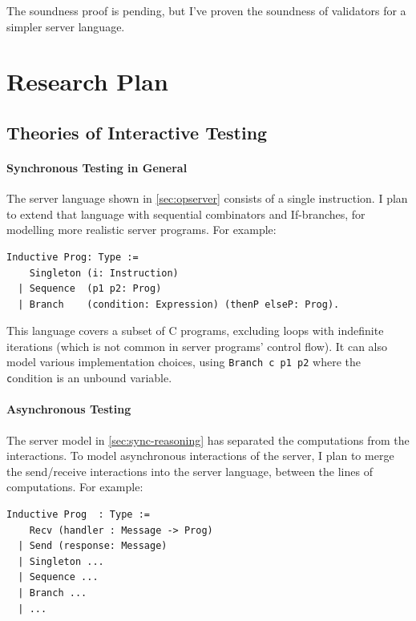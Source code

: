 \documentclass{article}
\newcommand{\ilc}[1]{\lstinline[style=customcoq]{#1}}
\theoremstyle{definition}
\begin{document}
The soundness proof is pending, but I've proven the soundness of validators for
a simpler server language.

\section{Research Plan}
\label{sec:research-plan}

\subsection{Theories of Interactive Testing}
\label{sec:future-theories}

\paragraph{Synchronous Testing in General}
The server language shown in \autoref{sec:opserver} consists of a single
instruction.  I plan to extend that language with sequential combinators and
If-branches, for modelling more realistic server programs.  For example:

\begin{lstlisting}[style=customcoq]
  Inductive Prog: Type :=
    Singleton (i: Instruction)
  | Sequence  (p1 p2: Prog)
  | Branch    (condition: Expression) (thenP elseP: Prog).
\end{lstlisting}

This language covers a subset of C programs, excluding loops with indefinite
iterations (which is not common in server programs' control flow).  It can also
model various implementation choices, using \ilc{Branch c p1 p2} where the
\ilc{c}ondition is an unbound variable.

\paragraph{Asynchronous Testing}
The server model in \autoref{sec:sync-reasoning} has separated the computations
from the interactions.  To model asynchronous interactions of the server, I plan
to merge the send/receive interactions into the server language, between the
lines of computations.  For example:

\begin{lstlisting}[style=customcoq]
  Inductive Prog  : Type :=
    Recv (handler : Message -> Prog)
  | Send (response: Message)
  | Singleton ...
  | Sequence ...
  | Branch ...
  | ...
\end{lstlisting}
\end{document}
